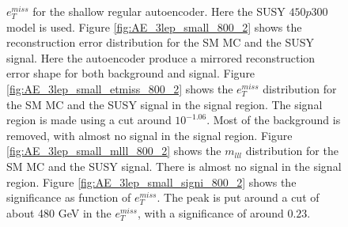 \begin{figure}[H]
{    $e_T^{miss}$ for the shallow regular autoencoder. Here the SUSY $450p300$ model is used. 
    Figure \ref{fig:AE_3lep_small_800_2} shows the reconstruction error 
    distribution for the SM MC and the SUSY signal. Here the autoencoder produce a mirrored reconstruction error shape for both background and 
    signal. Figure \ref{fig:AE_3lep_small_etmiss_800_2} shows the $e_T^{miss}$ distribution for the SM MC and the SUSY signal in the signal region. 
    The signal region is made using a cut around $10^{-1.06}$. Most of the background is removed, with almost no signal in the signal region.
    Figure \ref{fig:AE_3lep_small_mlll_800_2} shows the $m_{lll}$ distribution for the SM MC and the SUSY signal. 
    There is almost no signal in the signal region. Figure \ref{fig:AE_3lep_small_signi_800_2} shows the significance as function of
    $e_T^{miss}$. The peak is put around a cut of about 480 GeV in the $e_T^{miss}$, with a significance of around $0.23$.}
    \label{fig:AE_3lep_small_rec_sig_signi_800_2}
\end{figure}













